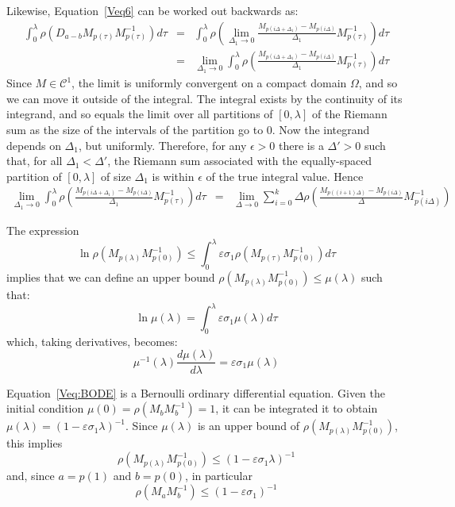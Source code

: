 \documentclass[11pt]{article}
\newcommand{\e}{\varepsilon}
\newcommand{\s}{\sigma}
\renewcommand{\l}{\lambda}
\renewcommand{\O}{\Omega}
\newcommand{\C}{\mathcal{C}}
\begin{document}
Likewise, Equation~\ref{Veq6} can be worked out backwards as:
\begin{eqnarray*}
	 \displaystyle{ \int_{0}^{\l} \rho(D_{a-b} M_{p(\tau)} M_{p(\tau)}^{-1}) d\tau } &=&  \displaystyle{ \int_{0}^{\l} \rho( \lim_{\Delta_1\rightarrow 0}\frac{M_{p(i\Delta+\Delta_1)} - M_{p(i\Delta)}}{\Delta_1}   M_{p(\tau)}^{-1}) d\tau } \\
	 				&=& \displaystyle{   \lim_{\Delta_1\rightarrow 0}  \int_{0}^{\l} \rho( \frac{M_{p(i\Delta+\Delta_1)} - M_{p(i\Delta)}}{\Delta_1}   M_{p(\tau)}^{-1}) d\tau }
\end{eqnarray*}
Since $M\in\C^1$, the limit is uniformly convergent on a compact domain $\O$, and so
we can move it outside of the integral. 
The integral exists by the continuity of its integrand, and so equals the limit over all partitions of
$[0,\l]$ of the Riemann sum as the size of the intervals of the partition go to 0.
Now the integrand depends on $\Delta_1$, but uniformly. 
Therefore, for any $\epsilon>0$ there is a $\Delta'>0$ such that, for all $\Delta_1<\Delta'$, 
	the Riemann sum associated with the equally-spaced partition of $[0,\l]$ of size $\Delta_1$ is within $\epsilon$ of the true integral value. 
Hence 
\begin{eqnarray*}
	 \displaystyle{   \lim_{\Delta_1\rightarrow 0}  \int_{0}^{\l} \rho( \frac{M_{p(i\Delta+\Delta_1)} - M_{p(i\Delta)}}{\Delta_1}   M_{p(\tau)}^{-1}) d\tau }
	 				&=&  \displaystyle{\lim_{\Delta\rightarrow 0} \sum_{i=0}^{k} \Delta \rho(\frac{M_{p((i+1)\Delta)} - M_{p(i\Delta)}}{\Delta} M_{p(i\Delta)}^{-1}) }
\end{eqnarray*}
\vspace*{0.2in}








The expression
\[ \ln\rho(M_{p(\l)} M_{p(0)}^{-1})  \le  \displaystyle{ \int_{0}^{\l} \e\s_1 \rho(M_{p(\tau)} M_{p(0)}^{-1}) d\tau} \]
implies that we can define an upper bound $  \rho(M_{p(\l)} M_{p(0)}^{-1}) \le \mu(\l)$ such that:
\[  \ln\mu(\l)=\displaystyle{ \int_{0}^{\l} \e\s_1 \mu(\l) d\tau}  \] 
which, taking derivatives, becomes: 
\begin{equation}\label{Veq:BODE}
	\mu^{-1}(\l) \frac{d \mu(\l)}{d\l} = \e\s_1 \mu(\l)
\end{equation}

Equation~\ref{Veq:BODE} is a Bernoulli ordinary differential equation. 
Given the initial condition $\mu(0) = \rho(M_b M_b^{-1}) = 1$, it can be integrated it to obtain
$\mu(\l) = (1 - \e\s_1\l)^{-1}$. 
Since $\mu(\l)$ is an upper bound of $\rho(M_{p(\l)} M_{p(0)}^{-1})$, this implies
\[    \rho(M_{p(\l)} M_{p(0)}^{-1}) \le (1 - \e\s_1\l)^{-1} \]
and, since $a=p(1)$ and $b=p(0)$, in particular
\[    \rho(M_{a} M_b^{-1}) \le (1 - \e\s_1)^{-1} \]
\end{document}
